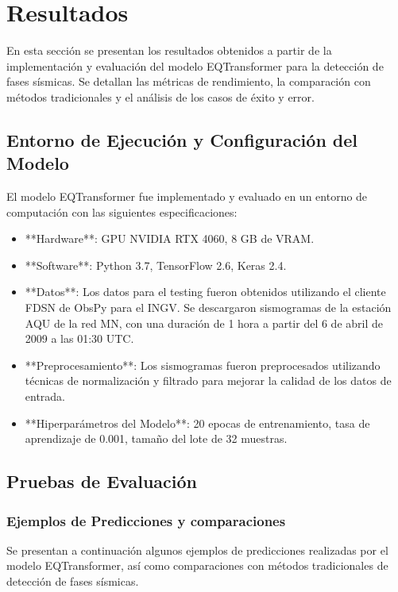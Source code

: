 \chapter{Resultados}\label{results}

En esta sección se presentan los resultados obtenidos a partir de la implementación y evaluación del modelo EQTransformer para la detección de fases sísmicas. Se detallan las métricas de rendimiento, la comparación con métodos tradicionales y el análisis de los casos de éxito y error.

\section{Entorno de Ejecución y Configuración del Modelo}

El modelo EQTransformer fue implementado y evaluado en un entorno de computación con las siguientes especificaciones:
\begin{itemize}
    \item **Hardware**: GPU NVIDIA RTX 4060, 8 GB de VRAM.
    \item **Software**: Python 3.7, TensorFlow 2.6, Keras 2.4.
    \item **Datos**: Los datos para el testing fueron obtenidos utilizando el cliente FDSN de ObsPy para el INGV. Se descargaron sismogramas de la estación AQU de la red MN, con una duración de 1 hora a partir del 6 de abril de 2009 a las 01:30 UTC.
    \item **Preprocesamiento**: Los sismogramas fueron preprocesados utilizando técnicas de normalización y filtrado para mejorar la calidad de los datos de entrada.
    \item **Hiperparámetros del Modelo**: 20 epocas de entrenamiento, tasa de aprendizaje de 0.001, tamaño del lote de 32 muestras. 
\end{itemize}   

\section{Pruebas de Evaluación}

\subsection{Ejemplos de Predicciones y comparaciones}

Se presentan a continuación algunos ejemplos de predicciones realizadas por el modelo EQTransformer, así como comparaciones con métodos tradicionales de detección de fases sísmicas.

